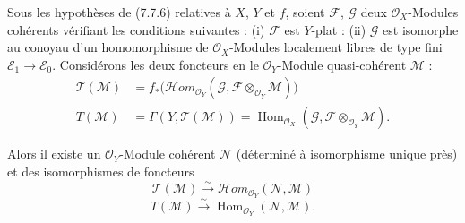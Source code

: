 \begin{corollary}[7.7.8]
Sous les hypothèses de \textup{(7.7.6)} relatives à $X$, $Y$ et $f$, soient $\mathscr F$,
$\mathscr G$ deux $\mathscr O_X$-Modules cohérents vérifiant les conditions
suivantes : \textup{(i)} $\mathscr F$ est $Y$-plat : \textup{(ii)} $\mathscr G$ est isomorphe au
conoyau d'un homomorphisme de $\mathscr O_X$-Modules localement libres de type
fini $\mathscr E_1\to\mathscr E_0$. Considérons les deux foncteurs en le
$\mathscr O_Y$-Module quasi-cohérent $\mathscr M$ :
\begin{align*}
  \mathscr T(\mathscr M)
  &=
  f_*
  \bigl(
    \mathscr{H}\!om_{\mathscr O_Y}
      (\mathscr G,\mathscr F\otimes_{\mathscr O_Y}\mathscr M)
  \bigr)\\
  T(\mathscr M)
  &=
  \Gamma(Y,\mathscr T(\mathscr M))
  =
  \operatorname{Hom}_{\mathscr O_X}
    (\mathscr G,\mathscr F\otimes_{\mathscr O_Y}\mathscr M).
\end{align*}

Alors il existe un $\mathscr O_Y$-Module cohérent $\mathscr N$ (déterminé à
isomorphisme unique près) et des isomorphismes de foncteurs
\[
  \mathscr T(\mathscr M)
  \xrightarrow{\sim}
  \mathscr{H}\!om_{\mathscr O_Y}(\mathscr N,\mathscr M)
  \tag{7.7.8.1}\label{III.7.7.8.1.fr}
\]
\[
  T(\mathscr M)
  \xrightarrow{\sim}
  \operatorname{Hom}_{\mathscr O_Y}(\mathscr N,\mathscr M).
  \tag{7.7.8.2}\label{III.7.7.8.2.fr}
\]
\end{corollary}


